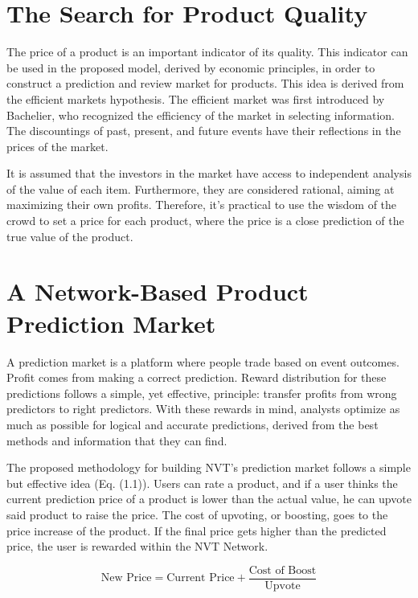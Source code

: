 
\section{The Search for Product Quality}

The price of a product is an important indicator of its quality. This indicator can be used in the proposed model, derived by economic principles, in order to construct a prediction and review market for products. This idea is derived from the efficient markets hypothesis. The efficient market was first introduced by Bachelier, who recognized the efficiency of the market in selecting information. The discountings of past, present, and future events have their reflections in the prices of the market.

It is assumed that the investors in the market have access to independent analysis of the value of each item. Furthermore, they are considered rational, aiming at maximizing their own profits. Therefore, it’s practical to use the wisdom of the crowd to set a price for each product, where the price is a close prediction of the true value of the product.

\section{A Network-Based Product Prediction Market}

A prediction market is a platform where people trade based on event outcomes. Profit comes from making a correct prediction. Reward distribution for these predictions follows a simple, yet effective, principle: transfer profits from wrong predictors to right predictors. With these rewards in mind, analysts optimize as much as possible for logical and accurate predictions, derived from the best methods and information that they can find.

The proposed methodology for building NVT's prediction market follows a simple but effective idea (Eq. (1.1)). Users can rate a product, and if a user thinks the current prediction price of a product is lower than the actual value, he can upvote said product to raise the price. The cost of upvoting, or boosting, goes to the price increase of the product. If the final price gets higher than the predicted price, the user is rewarded within the NVT Network.

\begin{equation}
	\textrm{New Price} = \textrm{Current Price} + \frac{\textrm{Cost of Boost}}{\textrm{Upvote}}
\end{equation}

